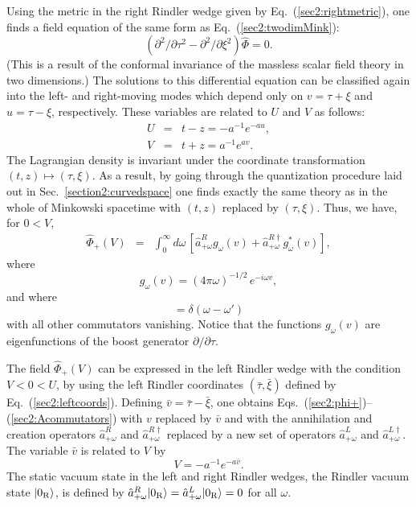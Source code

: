 \documentclass[12pt,nofootinbib,floatfix,aps,prd,showpacs,amsmath,amssymb,eqsecnum]{revtex4-2}
\begin{document}
Using the metric in the right Rindler wedge given by
Eq.~(\ref{sec2:rightmetric}), one finds a field equation of the same
form as Eq.~(\ref{sec2:twodimMink}):
\begin{equation}
\left( {\partial^2}/{\partial\tau^2} 
- {\partial^2}/{\partial\xi^2}\right)\hat{\Phi} = 0.
\end{equation}
(This is a result of the 
conformal invariance of the massless scalar field
theory in two dimensions.)  The solutions to this differential equation
can be classified again into the left- and right-moving modes which
depend only on $v=\tau+\xi$ and $u=\tau-\xi$, respectively.  These
variables are related to $U$ and $V$ as follows:
\begin{eqnarray}
U & = & t-z = -a^{-1}e^{-au},\\
V & = & t+z = a^{-1}e^{av}.
\end{eqnarray}
The Lagrangian density is invariant under the coordinate transformation
$(t,z)\mapsto (\tau,\xi)$.  As a result, 
by going through the quantization procedure laid out in
Sec.~\ref{section2:curvedspace} one finds exactly the same theory
as in the whole of Minkowski spacetime with $(t,z)$ replaced by
$(\tau,\xi)$.  Thus, we have, for $0 < V$,
\begin{eqnarray}
\hat{\Phi}_{+}(V) & = & \int_0^\infty d\omega\,\left[ 
\hat{a}_{+\omega}^Rg_{\omega}(v)
+ \hat{a}_{+\omega}^{R\dagger}g_{\omega}^*(v) \right],\label{sec2:phi+}
\end{eqnarray}
where
\begin{equation}
g_{\omega}(v) = (4\pi\omega)^{-1/2}\,e^{-i\omega v}, \label{sec2:gomegav}
\end{equation}
and where
\begin{equation}
[ \hat{a}_{+\omega}^R,\hat{a}_{+\omega'}^{R\dagger}] =
\delta(\omega-\omega')
\label{sec2:Acommutators}
\end{equation}
with all other commutators vanishing.
Notice that the functions $g_\omega(v)$ are eigenfunctions of the boost
generator $\partial/\partial\tau$.

The field $\hat{\Phi}_{+}(V)$ 
can be expressed in the left
Rindler wedge with the condition $V < 0 < U$, by using the
left Rindler coordinates $(\bar{\tau},\bar{\xi})$ defined by
Eq.~(\ref{sec2:leftcoords}).  Defining 
$\bar{v} = \bar{\tau} - \bar{\xi}$,  one obtains
Eqs.~(\ref{sec2:phi+})--(\ref{sec2:Acommutators}) with $v$
replaced by $\bar{v}$ and with the annihilation and
creation operators $\hat{a}_{+\omega}^R$ and 
$\hat{a}_{+\omega}^{R\dagger}$ replaced
by a new set of operators $\hat{a}_{+\omega}^L$ and
$\hat{a}_{+\omega}^{L\dagger}$.  The variable $\bar{v}$ 
is related to $V$ by
\begin{equation}
V  =  - a^{-1}e^{-a\bar{v}}.
\end{equation}
The static vacuum state in the left and right Rindler wedges,
the Rindler vacuum state $|0_{\rm R}\rangle$, is defined by 
$\hat{a}_{+\omega}^R|0_{\rm R}\rangle 
= \hat{a}_{+\omega}^L|0_{\rm R}\rangle = 0$ for
all $\omega$.
\end{document}

